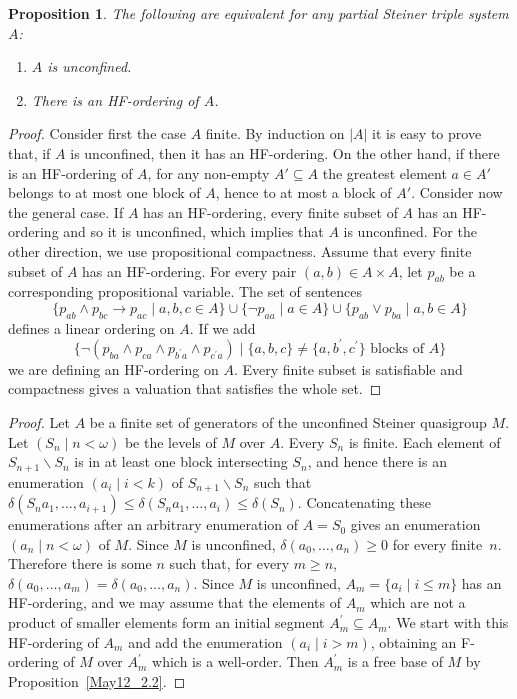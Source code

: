 \documentclass[10pt,a4paper]{article}
\theoremstyle{note}
\newtheorem{prop}[thm]{Proposition}
\begin{document}
\begin{prop}\label{2024_nov3} The following are equivalent for any partial Steiner triple system $A$:
\begin{enumerate}
\item $A$ is unconfined.
\item There is an HF-ordering of $A$.
\end{enumerate}	
\end{prop}	
\begin{proof} Consider first the case $A$ finite. By induction on $|A|$ it is easy to prove that, if $A$ is unconfined, then it has an HF-ordering. On the other hand, if there is an HF-ordering  of $A$, for any non-empty $A' \subseteq A$ the greatest element $a\in A'$ belongs to  at most one block of $A$, hence to at most a block of $A'$. Consider now the general case. If $A$ has an HF-ordering, every finite subset of $A$ has an HF-ordering and so it is unconfined, which implies that $A$ is unconfined. For the other direction, we use propositional compactness. Assume that every finite subset  of $A$ has an HF-ordering. For every pair  $(a,b)\in A\times A$, let $p_{ab}$ be a corresponding propositional variable. The set of sentences  
$$ \{p_{ab}\wedge p_{bc}\rightarrow p_{ac}\mid a,b,c\in A\}\cup \{\neg p_{aa}\mid a\in A\}\cup \{p_{ab}\vee p_{ba}\mid a,b\in A\}$$
 defines a linear ordering on $A$. If we add 
 $$\{\neg (p_{ba}\wedge p_{ca}\wedge p_{b^\prime a}\wedge p_{c^\prime a} )\mid \{a,b,c\}\neq\{a,b^\prime,c^\prime\} \text{ blocks of } A\}$$ 
 we are defining an HF-ordering on $A$. Every finite subset is satisfiable and compactness gives a valuation that satisfies the whole set.
\end{proof}

\begin{proof} Let $A$ be a finite set of generators of the unconfined Steiner quasigroup $M$. Let $(S_n\mid n<\omega)$ be the levels of $M$ over $A$. Every $S_n$ is finite. Each element of  $S_{n+1}\smallsetminus S_n$ is in at least one block intersecting $S_n$, and hence  there is an enumeration $(a_i\mid i<k)$ of $S_{n+1}\smallsetminus S_n$ such that  $\delta(S_na_1,\ldots,a_{i+1})\leq \delta(S_na_1,\ldots,a_i)\leq \delta(S_n)$. Concatenating  these enumerations after an arbitrary enumeration of $A=S_0$ gives an enumeration $(a_n\mid n<\omega)$ of $M$. Since $M$ is unconfined, $\delta(a_0,\ldots,a_n)\geq 0$  for every finite~$n$. Therefore there is some $n$  such that, for every $m\geq n$,\,  $\delta(a_0,\ldots,a_m)= \delta(a_0,\ldots,a_n)$. Since $M$ is unconfined, $A_m=\{a_i\mid i\leq m\}$ has an HF-ordering, and we may assume that the elements of $A_m$ which are not a product of smaller elements form an initial segment $A^\prime_m\subseteq A_m$. We start with this HF-ordering of $A_m$ and add the enumeration $(a_i\mid i>m)$, obtaining an F-ordering of $M$ over $A^\prime_m$ which is a well-order. Then $A^\prime_m$ is a free base of $M$ by Proposition~\ref{May12_2.2}.
	

\end{proof}				
\end{document}
